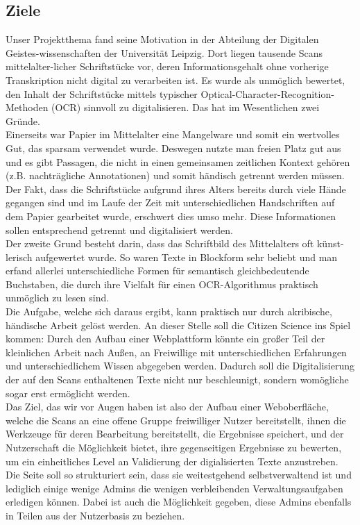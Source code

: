 \documentclass{article}
\begin{document}
\subsection{Ziele}
Unser Projektthema fand seine Motivation in der Abteilung der Digitalen Geistes-wissenschaften der Universität Leipzig.
Dort liegen tausende Scans mittelalter-licher Schriftstücke vor, deren Informationsgehalt ohne vorherige Transkription nicht digital zu verarbeiten ist. 
Es wurde als unmöglich bewertet, den Inhalt der Schriftstücke mittels typischer Optical-Character-Recognition-Methoden (OCR) sinnvoll zu digitalisieren. Das hat im Wesentlichen zwei Gründe.\\
Einerseits war Papier im Mittelalter eine Mangelware und somit ein wertvolles Gut, das sparsam verwendet wurde. Deswegen nutzte man freien Platz gut aus und es gibt Passagen, die nicht in einen gemeinsamen zeitlichen Kontext gehören (z.B. nachträgliche Annotationen) und somit händisch getrennt werden müssen. Der Fakt, dass die Schriftstücke aufgrund ihres Alters bereits durch viele Hände gegangen sind und im Laufe der Zeit mit unterschiedlichen Handschriften auf dem Papier gearbeitet wurde, erschwert dies umso mehr. Diese Informationen sollen entsprechend getrennt und digitalisiert werden. \\
Der zweite Grund besteht darin, dass das Schriftbild des Mittelalters oft künst-lerisch aufgewertet wurde. So waren Texte in Blockform sehr beliebt und man erfand allerlei unterschiedliche Formen für semantisch gleichbedeutende Buchstaben, die durch ihre Vielfalt für einen OCR-Algorithmus praktisch unmöglich zu lesen sind. \\
Die Aufgabe, welche sich daraus ergibt, kann praktisch nur durch akribische, händische Arbeit gelöst werden. An dieser Stelle soll die Citizen Science ins Spiel kommen: Durch den Aufbau einer Webplattform könnte ein großer Teil der kleinlichen Arbeit nach Außen, an Freiwillige mit unterschiedlichen Erfahrungen und unterschiedlichem Wissen abgegeben werden. Dadurch soll die Digitalisierung der auf den Scans enthaltenen Texte nicht nur beschleunigt, sondern womögliche sogar erst ermöglicht werden. \\
Das Ziel, das wir vor Augen haben ist also der Aufbau einer Weboberfläche, welche die Scans an eine offene Gruppe freiwilliger Nutzer bereitstellt, ihnen die Werkzeuge für deren Bearbeitung bereitstellt, die Ergebnisse speichert, und der Nutzerschaft die Möglichkeit bietet, ihre gegenseitigen Ergebnisse zu bewerten, um ein einheitliches Level an Validierung der digialisierten Texte anzustreben. Die Seite soll so strukturiert sein, dass sie weitestgehend selbstverwaltend ist und lediglich einige wenige Admins die wenigen verbleibenden Verwaltungsaufgaben erledigen können. Dabei ist auch die Möglichkeit gegeben, diese Admins ebenfalls in Teilen aus der Nutzerbasis zu beziehen. \\
\end{document}
